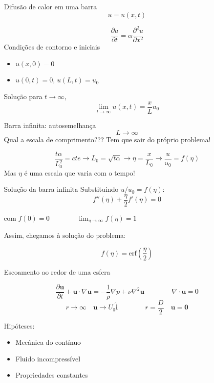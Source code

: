 \documentclass{beamer}
\newcommand{\pr}[1]{\ensuremath{ \mathbf{#1}}}    %
\newcommand{\lra}{\ensuremath{\longrightarrow}}
\newcommand{\p}[1]{\ensuremath{ \mathbf{#1}}}    %
\newcommand{\pd}{\ensuremath{\partial}}
\begin{document}
\begin{frame}{Difusão de calor em uma barra}
  \[u = u(x,t) \]
  
\[
\frac{\pd u}{\pd t} = \alpha \frac{\pd^2 u}{\pd x^2}
\]
Condições de contorno e iniciais
\begin{itemize}
\item $u(x,0) = 0$
\item $u(0,t) = 0$, $u(L,t) = u_0$
\end{itemize}

Solução para $t\longrightarrow\infty$,
\[
\lim_{t\to\infty} {u(x,t)} = \frac{x}{L} u_0
\]

\end{frame}

\begin{frame}{Barra infinita: autosemelhança}
  \[L\to\infty\]
  Qual a escala de comprimento??? Tem que sair do próprio problema!

\[
\frac{t\alpha}{L_0^2} = cte\lra L_0 = \sqrt{t\alpha} \lra \eta = \frac{x}{L_0} \lra \frac{u}{u_0} = f(\eta)
\]
Mas $\eta$ é uma escala que varia com o tempo!

\end{frame}

\begin{frame}{Solução da barra infinita}
  Substituindo $u/u_0 = f(\eta)$:
  \[
f''(\eta) + \frac{\eta}{2} f'(\eta) = 0
\]

com $f(0) = 0 \qquad\qquad \lim_{\eta\to\infty} f(\eta) = 1$

Assim, chegamos à solução do problema:

\[
f(\eta) = \mathrm{erf}\left(\frac{\eta}{2}\right)
\]

\end{frame}


\begin{frame}{Escoamento ao redor de uma esfera}

  \[
  \frac{\pd\p{u}}{\pd t} + \p{u}\cdot\nabla\p{u} = -\frac{1}{\rho}\nabla p + \nu\nabla^2\p{u} \qquad\qquad \nabla\cdot\p{u} = 0
  \]
  \[
 r\lra\infty \quad \p{u}\lra U_0\p{\hat{i}} \qquad\qquad r=\frac{D}{2}\quad \p{u} = \p{0}
\]

Hipóteses:
\begin{itemize}
\item Mecânica do contínuo
\item Fluido incompressível
\item Propriedades constantes
\end{itemize}
\end{frame}
\end{document}
